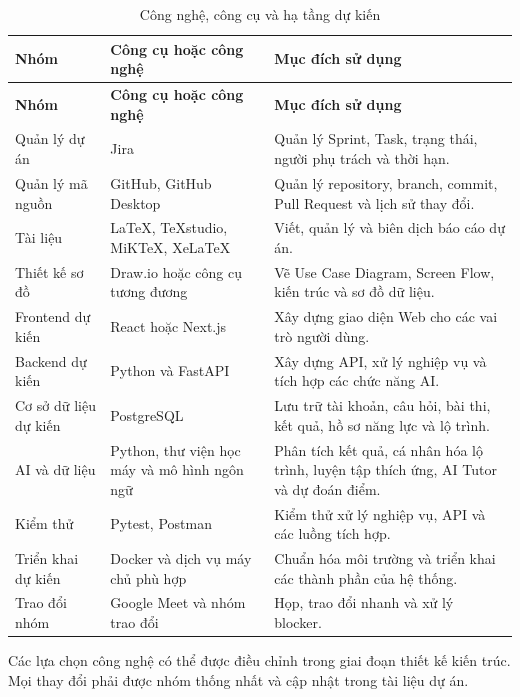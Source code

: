 \begin{longtable}{
		|p{3.7cm}
		|p{4.3cm}
		|p{6.6cm}|
	}
	\caption{Công nghệ, công cụ và hạ tầng dự kiến}
	\label{tab:tools}\\
	\hline
	\textbf{Nhóm} &
	\textbf{Công cụ hoặc công nghệ} &
	\textbf{Mục đích sử dụng} \\
	\hline
	\endfirsthead
	
	\hline
	\textbf{Nhóm} &
	\textbf{Công cụ hoặc công nghệ} &
	\textbf{Mục đích sử dụng} \\
	\hline
	\endhead
	
	Quản lý dự án &
	Jira &
	Quản lý Sprint, Task, trạng thái, người phụ trách và thời hạn. \\
	\hline
	
	Quản lý mã nguồn &
	GitHub, GitHub Desktop &
	Quản lý repository, branch, commit, Pull Request và lịch sử thay đổi. \\
	\hline
	
	Tài liệu &
	LaTeX, TeXstudio, MiKTeX, XeLaTeX &
	Viết, quản lý và biên dịch báo cáo dự án. \\
	\hline
	
	Thiết kế sơ đồ &
	Draw.io hoặc công cụ tương đương &
	Vẽ Use Case Diagram, Screen Flow, kiến trúc và sơ đồ dữ liệu. \\
	\hline
	
	Frontend dự kiến &
	React hoặc Next.js &
	Xây dựng giao diện Web cho các vai trò người dùng. \\
	\hline
	
	Backend dự kiến &
	Python và FastAPI &
	Xây dựng API, xử lý nghiệp vụ và tích hợp các chức năng AI. \\
	\hline
	
	Cơ sở dữ liệu dự kiến &
	PostgreSQL &
	Lưu trữ tài khoản, câu hỏi, bài thi, kết quả, hồ sơ năng lực và lộ trình. \\
	\hline
	
	AI và dữ liệu &
	Python, thư viện học máy và mô hình ngôn ngữ &
	Phân tích kết quả, cá nhân hóa lộ trình, luyện tập thích ứng, AI Tutor
	và dự đoán điểm. \\
	\hline
	
	Kiểm thử &
	Pytest, Postman &
	Kiểm thử xử lý nghiệp vụ, API và các luồng tích hợp. \\
	\hline
	
	Triển khai dự kiến &
	Docker và dịch vụ máy chủ phù hợp &
	Chuẩn hóa môi trường và triển khai các thành phần của hệ thống. \\
	\hline
	
	Trao đổi nhóm &
	Google Meet và nhóm trao đổi &
	Họp, trao đổi nhanh và xử lý blocker. \\
	\hline
	
\end{longtable}

Các lựa chọn công nghệ có thể được điều chỉnh trong giai đoạn thiết kế
kiến trúc. Mọi thay đổi phải được nhóm thống nhất và cập nhật trong tài
liệu dự án.